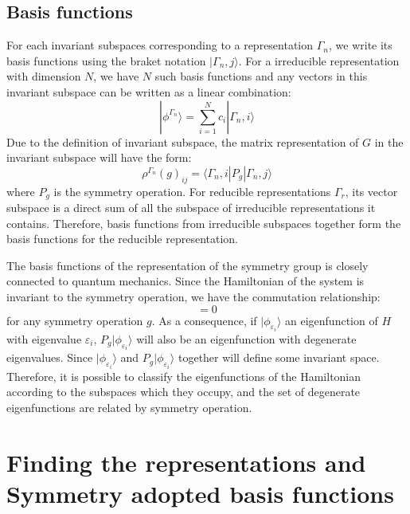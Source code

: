 \documentclass{article}
\begin{document}
\subsection{Basis functions}
For each invariant subspaces corresponding to a representation $\Gamma_n$, we write its basis 
functions using the braket notation $|\Gamma_n,j\rangle$. For a irreducible representation with 
dimension $N$, we have $N$ such basis functions and any vectors in this invariant subspace 
can be written as a linear combination:
\begin{equation}
    |\phi^{\Gamma_n}\rangle = \sum_{i = 1}^N c_i |\Gamma_n,i\rangle
\end{equation} 
Due to the definition of invariant subspace, the matrix representation of $G$ in the invariant 
subspace will have the form:
\begin{equation}
    \rho^{\Gamma_n}(g)_{ij} = \langle \Gamma_n,i | P_g | \Gamma_n,j \rangle
\end{equation}
where $P_g$ is the symmetry operation. 
For reducible representations $\Gamma_{r}$, its vector subspace is a direct sum of all the subspace 
of irreducible representations it contains. Therefore, basis functions from irreducible 
subspaces together form the basis functions for the reducible representation.

The basis functions of the representation of the symmetry group is closely connected to quantum mechanics.
Since the Hamiltonian of the system is invariant to the symmetry operation, we have the commutation 
relationship:
\begin{equation}
    [P_g,H] = 0
\end{equation}
for any symmetry operation $g$. As a consequence, if $|\phi_{\varepsilon_i}\rangle$ an eigenfunction of $H$
with eigenvalue $\varepsilon_i$, $P_g|\phi_{\varepsilon_i}\rangle$ will also be an eigenfunction 
with degenerate eigenvalues. Since $|\phi_{\varepsilon_i}\rangle$ and $P_g|\phi_{\varepsilon_i}\rangle$
together will define some invariant space. Therefore, it is possible to classify the eigenfunctions of the 
Hamiltonian according to the subspaces which they occupy, and the set of degenerate eigenfunctions are 
related by symmetry operation. 

\section{Finding the representations and Symmetry adopted basis functions}
\end{document}
